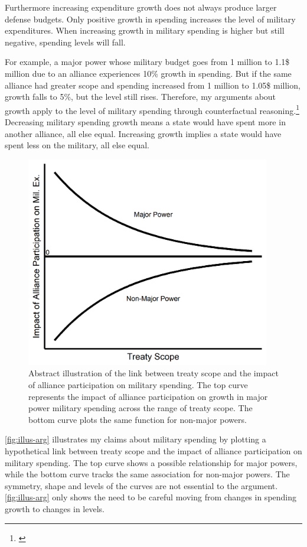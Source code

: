 \documentclass[12pt]{article}
\begin{document}
Furthermore increasing expenditure growth does not always produce larger defense budgets. 
Only positive growth in spending increases the level of military expenditures. 
When increasing growth in military spending is higher but still negative, spending levels will fall. 


For example, a major power whose military budget goes from 1 million to 1.1\$ million due to an alliance experiences 10\% growth in spending. 
But if the same alliance had greater scope and spending increased from 1 million to 1.05\$ million, growth falls to 5\%, but the level still rises. 
Therefore, my arguments about growth apply to the level of military spending through counterfactual reasoning.\footnote{\citep{Fearon1991}} 
Decreasing military spending growth means a state would have spent more in another alliance, all else equal. 
Increasing growth implies a state would have spent less on the military, all else equal.


\begin{figure}[htbp]
	\centering
		\includegraphics[width=0.95\textwidth]{../figures/illus-arg.png}
	\caption{Abstract illustration of the link between treaty scope and the impact of alliance participation on military spending.
	The top curve represents the impact of alliance participation on growth in major power military spending across the range of treaty scope.
	The bottom curve plots the same function for non-major powers.}
	\label{fig:illus-arg}
\end{figure}


\autoref{fig:illus-arg} illustrates my claims about military spending by plotting a hypothetical link between treaty scope and the impact of alliance participation on military spending. 
The top curve shows a possible relationship for major powers, while the bottom curve tracks the same association for non-major powers. 
The symmetry, shape and levels of the curves are not essential to the argument.
\autoref{fig:illus-arg} only shows the need to be careful moving from changes in spending growth to changes in levels. 
\end{document}
